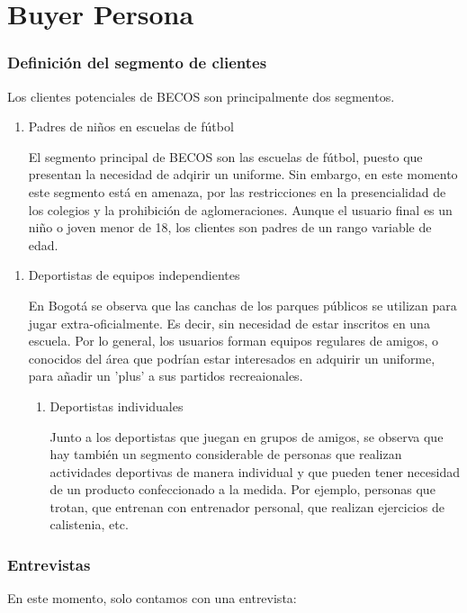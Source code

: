 \documentclass[11pt]{article}
\begin{document}
\section{Buyer Persona}
\label{sec:org12fddb8}
\subsubsection{Definición del segmento de clientes}
\label{sec:orga9b4ae6}
Los clientes potenciales de BECOS son principalmente
dos segmentos.

\begin{enumerate}
\item Padres de niños en escuelas de fútbol

El segmento principal de BECOS son
las escuelas de fútbol, puesto
que presentan la necesidad
de adqirir un uniforme.
Sin embargo, en este momento
este segmento está en amenaza,
por las restricciones en la
presencialidad de los colegios
y la prohibición de aglomeraciones.
Aunque el usuario final es un niño
o joven menor de 18, los clientes
son padres de un rango variable de
edad.
\end{enumerate}


\begin{enumerate}
\item Deportistas de equipos independientes 

En Bogotá se observa que las
canchas de los parques públicos se utilizan
para jugar extra-oficialmente. Es decir,
sin necesidad de estar inscritos en una
escuela. Por lo general, los usuarios
forman equipos regulares de amigos, o
conocidos del área que podrían estar
interesados en adquirir un uniforme,
para añadir un 'plus' a sus partidos
recreaionales.

\begin{enumerate}
\item Deportistas individuales

Junto a los deportistas que juegan en grupos
de amigos, se observa que hay también un
segmento considerable de personas que
realizan actividades deportivas de manera
individual y que pueden tener necesidad
de un producto confeccionado a la medida.
Por ejemplo, personas que trotan, que
entrenan con entrenador personal, que
realizan ejercicios de calistenia, etc.
\end{enumerate}
\end{enumerate}



\subsubsection{Entrevistas}
\label{sec:orga1d90d9}
En este momento, solo contamos con una entrevista:
\end{document}
